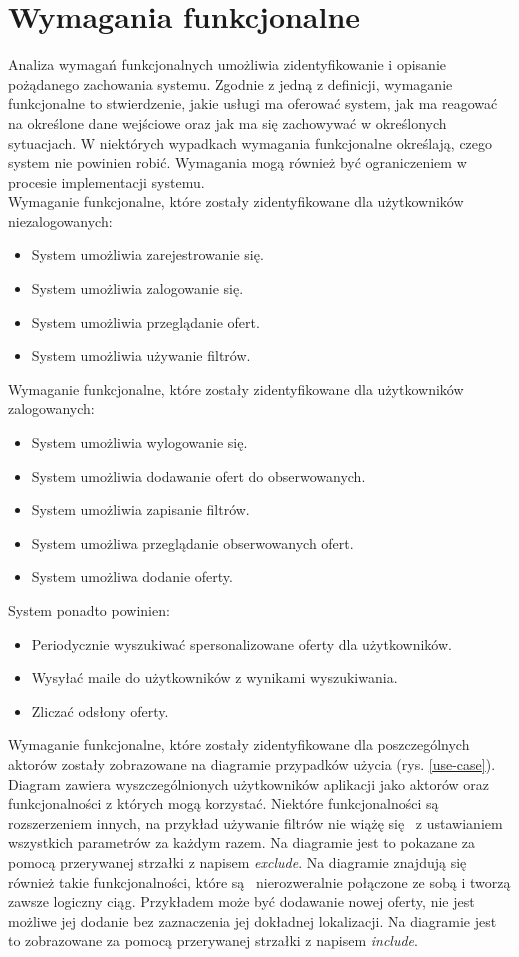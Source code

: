 \section{Wymagania funkcjonalne}
\label{sec:wymaganiaFunkcjonalne}
Analiza wymagań funkcjonalnych umożliwia zidentyfikowanie i opisanie pożądanego zachowania systemu. Zgodnie z jedną z definicji, wymaganie funkcjonalne to stwierdzenie, jakie usługi ma oferować system, jak ma reagować na określone dane wejściowe oraz jak ma się zachowywać w określonych sytuacjach. W niektórych wypadkach wymagania funkcjonalne określają, czego system nie powinien robić. Wymagania mogą również być ograniczeniem w procesie implementacji systemu.\cite{requirements}\\ Wymaganie funkcjonalne, które zostały zidentyfikowane dla użytkowników niezalogowanych:
\begin{itemize}
\item System umożliwia zarejestrowanie się.
\item System umożliwia zalogowanie się.
\item System umożliwia przeglądanie ofert.
\item System umożliwia używanie filtrów.
\end{itemize}
Wymaganie funkcjonalne, które zostały zidentyfikowane dla użytkowników zalogowanych:
\begin{itemize}
\item System umożliwia wylogowanie się.
\item System umożliwia dodawanie ofert do obserwowanych.
\item System umożliwia zapisanie filtrów.
\item System umożliwa przeglądanie obserwowanych ofert.
\item System umożliwa dodanie oferty.
\end{itemize}
System ponadto powinien:
\begin{itemize}
\item Periodycznie wyszukiwać spersonalizowane oferty dla użytkowników.
\item Wysyłać maile do użytkowników z wynikami wyszukiwania.
\item Zliczać odsłony oferty.
\end{itemize}
Wymaganie funkcjonalne, które zostały zidentyfikowane dla poszczególnych aktorów zostały zobrazowane na diagramie przypadków użycia (rys. \ref{use-case}). Diagram zawiera wyszczególnionych użytkowników aplikacji jako aktorów oraz funkcjonalności z których mogą korzystać. Niektóre funkcjonalności są rozszerzeniem innych, na przykład używanie filtrów nie wiążę  się  z ustawianiem wszystkich parametrów za każdym razem. Na diagramie jest to pokazane za pomocą przerywanej strzałki z napisem \textit{exclude}. Na diagramie znajdują się również takie funkcjonalności, które są  nierozweralnie połączone ze sobą i tworzą zawsze logiczny ciąg. Przykładem może być dodawanie nowej oferty, nie jest możliwe jej dodanie bez zaznaczenia jej dokładnej lokalizacji. Na diagramie jest to zobrazowane za pomocą przerywanej strzałki z napisem \textit{include}.


